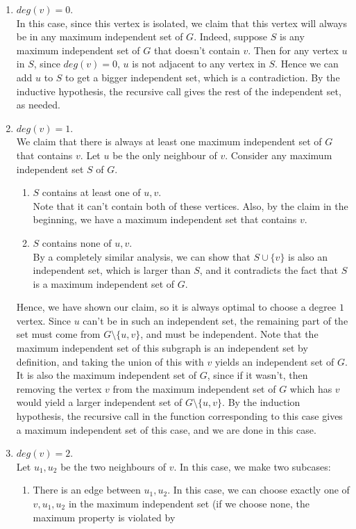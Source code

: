 \documentclass[answers]{exam}
\newcommand{\nl}{\vspace{0.2cm}\\}
\begin{document}
\begin{questions}
\begin{solution}
\begin{enumerate}
    \item $deg(v) = 0$.\nl
    In this case, since this vertex is isolated, we claim that this vertex will always be in any maximum independent set of $G$. Indeed, suppose $S$ is any maximum independent set of $G$ that doesn't
        contain $v$. Then for any vertex $u$ in $S$, since $deg(v) = 0$, $u$ is not adjacent to any vertex in $S$. Hence we can add $u$ to $S$ to get a bigger independent set, which is a
        contradiction. By the inductive hypothesis, the recursive call gives the rest of the independent set, as needed.
    \item $deg(v) = 1$.\nl
    We claim that there is always at least one maximum independent set of $G$ that contains $v$. Let $u$ be the only neighbour of $v$. Consider any maximum independent set $S$ of $G$.
    \begin{enumerate}
        \item $S$ contains at least one of $u, v$.\nl
        Note that it can't contain both of these vertices. Also, by the claim in the beginning, we have a maximum independent set that contains $v$.
        \item $S$ contains none of $u, v$.\nl
        By a completely similar analysis, we can show that $S \cup \{v\}$ is also an independent set, which is larger than $S$, and it contradicts the fact that $S$ is a maximum independent set of $G$.
    \end{enumerate}
    Hence, we have shown our claim, so it is always optimal to choose a degree $1$ vertex. Since $u$ can't be in such an independent set, the remaining part of the set must come from $G \setminus \{u,
        v\}$, and must be independent. Note that the maximum independent set of this subgraph is an independent set by definition, and taking the union of this with $v$ yields an independent set of
        $G$. It is also the maximum independent set of $G$, since if it wasn't, then removing the vertex $v$ from the maximum independent set of $G$ which has $v$ would yield a larger independent set
        of $G \setminus \{u, v\}$. By the induction hypothesis, the recursive call in the function corresponding to this case gives a maximum independent set of this case, and we are done in this
        case.
    \item $deg(v) = 2$.\nl
        Let $u_1, u_2$ be the two neighbours of $v$.
        In this case, we make two subcases:
        \begin{enumerate}
            \item There is an edge between $u_1, u_2$. In this case, we can choose exactly one of $v, u_1, u_2$ in the maximum independent set (if we choose none, the maximum property is violated by

\end{enumerate}
\end{enumerate}
\end{solution}
\end{questions}
\end{document}
